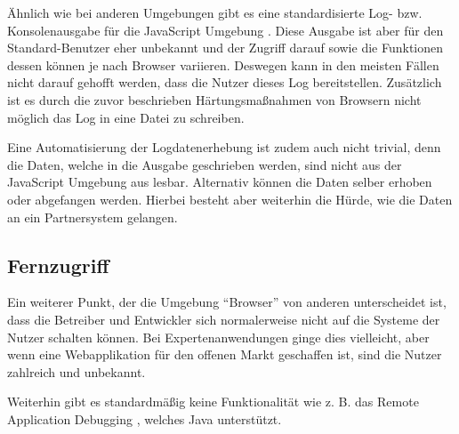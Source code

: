 Ähnlich wie bei anderen Umgebungen gibt es eine standardisierte Log- bzw. Konsolenausgabe für die JavaScript Umgebung \cite{MDNConsole}. Diese Ausgabe ist aber für den Standard-Benutzer eher unbekannt und der Zugriff darauf sowie die Funktionen dessen können je nach Browser variieren. Deswegen kann in den meisten Fällen nicht darauf gehofft werden, dass die Nutzer dieses Log bereitstellen. Zusätzlich ist es durch die zuvor beschrieben Härtungsmaßnahmen von Browsern nicht möglich das Log in eine Datei zu schreiben.

Eine Automatisierung der Logdatenerhebung ist zudem auch nicht trivial, denn die Daten, welche in die Ausgabe geschrieben werden, sind nicht aus der JavaScript Umgebung aus lesbar. Alternativ können die Daten selber erhoben oder abgefangen werden. Hierbei besteht aber weiterhin die Hürde, wie die Daten an ein Partnersystem gelangen.

\subsection{Fernzugriff}

Ein weiterer Punkt, der die Umgebung \enquote{Browser} von anderen unterscheidet ist, dass die Betreiber und Entwickler sich normalerweise nicht auf die Systeme der Nutzer schalten können. Bei Expertenanwendungen ginge dies vielleicht, aber wenn eine Webapplikation für den offenen Markt geschaffen ist, sind die Nutzer zahlreich und unbekannt.

Weiterhin gibt es standardmäßig keine Funktionalität wie z. B. das Remote Application Debugging \cite{JavaDebugWireProtocol}, welches Java unterstützt.